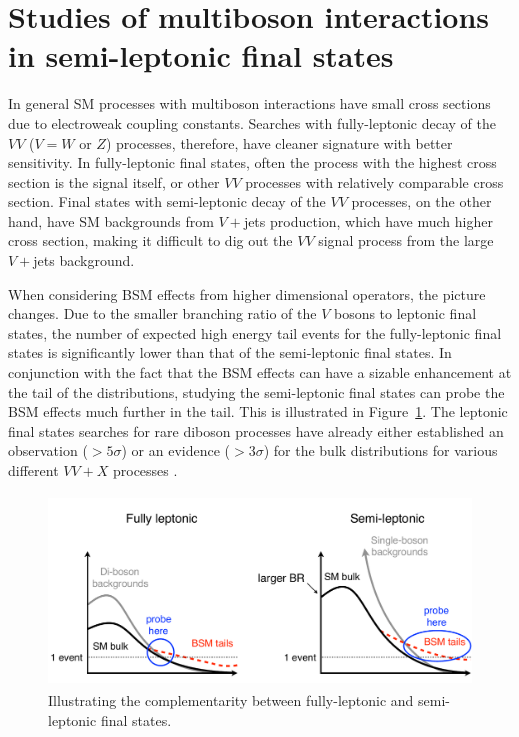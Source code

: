 \documentclass[10pt]{article}
\begin{document}
\section{Studies of multiboson interactions in semi-leptonic final states}

In general SM processes with multiboson interactions have small cross sections due to electroweak coupling constants.
Searches with fully-leptonic decay of the $VV$ ($V=W$ or $Z$) processes, therefore, have cleaner signature with better sensitivity.
In fully-leptonic final states, often the process with the highest cross section is the signal itself, or other $VV$ processes with relatively comparable cross section.
Final states with semi-leptonic decay of the $VV$ processes, on the other hand, have SM backgrounds from $V+$jets production, which have much higher cross section, making it difficult to dig out the $VV$ signal process from the large $V+$jets background.

When considering BSM effects from higher dimensional operators, the picture changes.
Due to the smaller branching ratio of the $V$ bosons to leptonic final states, the number of expected high energy tail events for the fully-leptonic final states is significantly lower than that of the semi-leptonic final states.
In conjunction with the fact that the BSM effects can have a sizable enhancement at the tail of the distributions, studying the semi-leptonic final states can probe the BSM effects much further in the tail.
This is illustrated in Figure~\ref{fig:SemiLeptonicIllustration}.
The leptonic final states searches for rare diboson processes have already either established an observation ($>5\sigma$) or an evidence ($>3\sigma$) for the bulk distributions for various different $VV+X$ processes \cite{}.

\begin{figure}[htb]
\centering
\includegraphics[height=2.0in]{SemiLeptonic.pdf}
\caption{Illustrating the complementarity between fully-leptonic and semi-leptonic final states.}
\label{fig:SemiLeptonicIllustration}
\end{figure}
\end{document}
